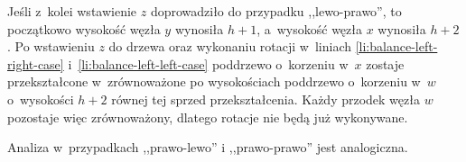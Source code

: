 Jeśli z~kolei wstawienie $z$ doprowadziło do przypadku ,,lewo-prawo'', to początkowo wysokość węzła $y$ wynosiła $h+1$, a~wysokość węzła $x$ wynosiła $h+2$.
Po wstawieniu $z$ do drzewa oraz wykonaniu rotacji w~liniach \ref{li:balance-left-right-case} i~\ref{li:balance-left-left-case} poddrzewo o~korzeniu w~$x$ zostaje przekształcone w~zrównoważone po wysokościach poddrzewo o~korzeniu w~$w$ o~wysokości $h+2$ równej tej sprzed przekształcenia.
Każdy przodek węzła $w$ pozostaje więc zrównoważony, dlatego rotacje nie będą już wykonywane.

Analiza w~przypadkach ,,prawo-lewo'' i ,,prawo-prawo'' jest analogiczna.
